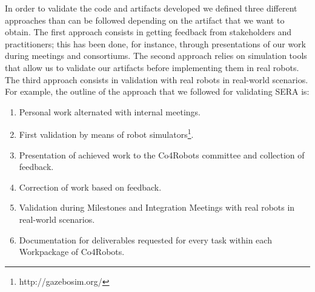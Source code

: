 
In order to validate the code and artifacts developed we defined three different approaches than can be followed depending on the artifact that we want to obtain.
The first approach consists in getting feedback from stakeholders and practitioners; this has been done, for instance, through presentations of our work during meetings and consortiums.
The second approach relies on simulation tools that allow us to validate our artifacts before implementing them in real robots.
The third approach consists in validation with real robots in real-world scenarios.
For example, the outline of the approach that we followed for validating SERA is:
\begin{enumerate}
\item Personal work alternated with internal meetings.
\item First validation by means of robot simulators\footnote{http://gazebosim.org/}.
\item Presentation of achieved work to the Co4Robots committee and collection of feedback.
\item Correction of work based on feedback.
\item Validation during Milestones and Integration Meetings with real robots in real-world scenarios.
\item Documentation for deliverables requested for every task within each Workpackage of Co4Robots.
\end{enumerate}



